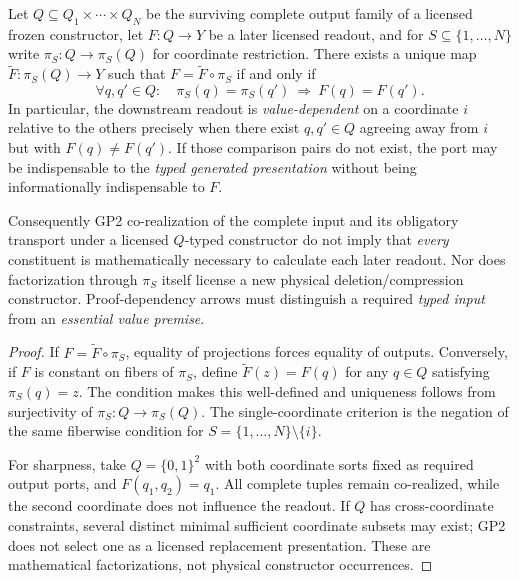 \documentclass[12pt,a4paper]{article}
\begin{document}
\begin{proposition}
\label{p2a:prop:v281-complete-input-factorization}
Let \(Q\subseteq Q_1\times\cdots\times Q_N\) be the surviving
complete output family of a licensed frozen constructor, let
\(F:Q\to Y\) be a later licensed readout, and for
\(S\subseteq\{1,\ldots,N\}\) write \(\pi_S:Q\to\pi_S(Q)\)
for coordinate restriction.  There exists a unique map
\(\widetilde F:\pi_S(Q)\to Y\) such that
\(F=\widetilde F\circ\pi_S\) if and only if
\[
 \forall q,q'\in Q:\quad
 \pi_S(q)=\pi_S(q')\ \Longrightarrow\ F(q)=F(q').
\]
In particular, the downstream readout is \emph{value-dependent} on a
coordinate \(i\) relative to the others precisely when there exist
\(q,q'\in Q\) agreeing away from \(i\) but with
\(F(q)\neq F(q')\).  If those comparison pairs do not exist, the
port may be indispensable to the \emph{typed generated presentation}
without being informationally indispensable to \(F\).

Consequently GP2 co-realization of the complete input and its obligatory
transport under a licensed \(Q\)-typed constructor do not imply that
\emph{every} constituent is mathematically necessary to calculate each
later readout.  Nor does factorization through \(\pi_S\) itself license a
new physical deletion/compression constructor.  Proof-dependency arrows
must distinguish a required \emph{typed input} from an \emph{essential
value premise}.
\end{proposition}
\begin{proof}
If \(F=\widetilde F\circ\pi_S\), equality of projections forces
equality of outputs.  Conversely, if \(F\) is constant on fibers of
\(\pi_S\), define \(\widetilde F(z)=F(q)\) for any
\(q\in Q\) satisfying \(\pi_S(q)=z\).  The condition makes this
well-defined and uniqueness follows from surjectivity of
\(\pi_S:Q\to\pi_S(Q)\).  The single-coordinate criterion is the
negation of the same fiberwise condition for
\(S=\{1,\ldots,N\}\setminus\{i\}\).

For sharpness, take \(Q=\{0,1\}^2\) with both coordinate sorts fixed as
required output ports, and \(F(q_1,q_2)=q_1\).  All complete tuples
remain co-realized, while the second coordinate does not influence the
readout.  If \(Q\) has cross-coordinate constraints, several distinct
minimal sufficient coordinate subsets may exist; GP2 does not select one
as a licensed replacement presentation.  These are mathematical
factorizations, not physical constructor occurrences.
\end{proof}
\end{document}
